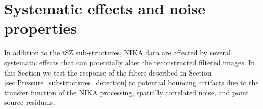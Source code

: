 \documentclass[twocolumn,traditabstract]{aa}
\begin{document}
\section{Systematic effects and noise properties}\label{sec:Systematics_and_noise_properties}
In addition to the tSZ sub-structures, NIKA data are affected by several systematic effects that can potentially alter the reconstructed filtered images. In this Section we test the response of the filters described in Section \ref{sec:Pressure_substructures_detection} to potential bouncing artifacts due to the transfer function of the NIKA processing, spatially correlated noise, and point source residuals.
\end{document}
